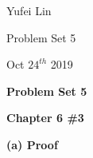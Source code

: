 \documentclass[a4paper,12pt]{report}
\begin{document}
\noindent
Yufei Lin

\noindent
Problem Set 5

\noindent
Oct \(24^{th}\) 2019

\begin{center}
\textbf{Problem Set 5}
\end{center}

\noindent
\textbf{Chapter 6 \#3}

\noindent
\textbf{(a) Proof}

\noindent
\end{document}

